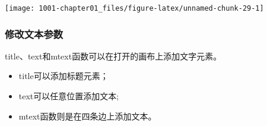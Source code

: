 \documentclass[
]{book}
\providecommand{\tightlist}{%
  \setlength{\itemsep}{0pt}\setlength{\parskip}{0pt}}
\begin{document}
\begin{center}\texttt{[image: 1001-chapter01\_files/figure-latex/unnamed-chunk-29-1]} \end{center}

\hypertarget{ux4feeux6539ux6587ux672cux53c2ux6570}{%
\subsubsection{修改文本参数}\label{ux4feeux6539ux6587ux672cux53c2ux6570}}

title、text和mtext函数可以在打开的画布上添加文字元素。

\begin{itemize}
\tightlist
\item
  title可以添加标题元素；
\item
  text可以任意位置添加文本;
\item
  mtext函数则是在四条边上添加文本。
\end{itemize}
\end{document}
